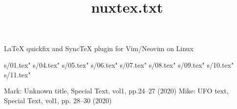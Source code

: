 \documentclass[a4,12pt]{ujarticle}
\begin{document}
\title{nuxtex.txt}
\maketitle
\noindent
\begin{center}
LaTeX quickfix and SyncTeX plugin for Vim/Neovim on Linux
\end{center}

 s/01.tex"
 s/04.tex"
 s/05.tex"
 s/06.tex"
 s/07.tex"
 s/08.tex"
 s/09.tex"
 s/10.tex"
 s/11.tex"

\begin{thebibliography}{99}
Mark: Unknown title, Special Text, vol1, pp.24--27 (2020)
Mike: UFO text, Special Text, vol1, pp. 28--30 (2020)
\end{thebibliography}
\begin{thebibliography}{9}
\end{thebibliography}
\end{document}
